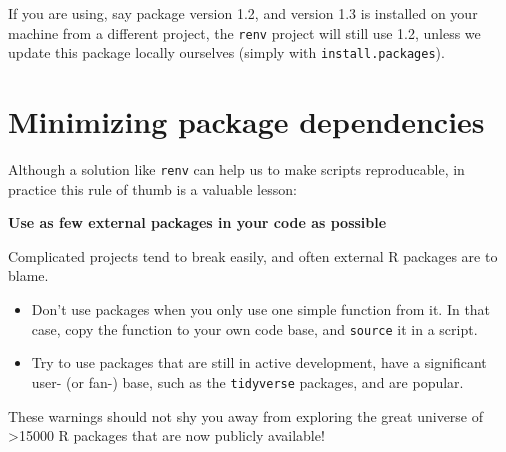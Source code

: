 \documentclass[]{book}
\begin{document}
If you are using, say package version 1.2, and version 1.3 is installed on your machine from a different project, the \texttt{renv} project will still use 1.2, unless we update this package locally ourselves (simply with \texttt{install.packages}).

\hypertarget{minimizing-package-dependencies}{%
\section{Minimizing package dependencies}\label{minimizing-package-dependencies}}

Although a solution like \texttt{renv} can help us to make scripts reproducable, in practice this rule of thumb is a valuable lesson:

\textbf{Use as few external packages in your code as possible}

Complicated projects tend to break easily, and often external R packages are to blame.

\begin{itemize}
\item
  Don't use packages when you only use one simple function from it. In that case, copy the function to your own code base, and \texttt{source} it in a script.
\item
  Try to use packages that are still in active development, have a significant user- (or fan-) base, such as the \texttt{tidyverse} packages, and are popular.
\end{itemize}

These warnings should not shy you away from exploring the great universe of \textgreater15000 R packages that are now publicly available!


\end{document}
